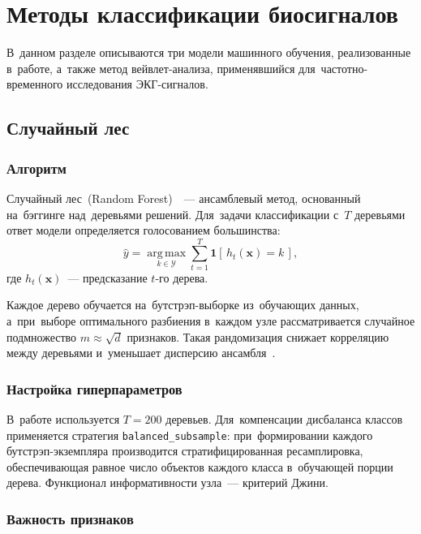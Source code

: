 \section{Методы классификации биосигналов}
\label{sec:Chapter2}

В~данном разделе описываются три модели машинного обучения,
реализованные в~работе, а~также метод вейвлет-анализа,
применявшийся для~частотно-временного исследования ЭКГ-сигналов.

\subsection{Случайный лес}

\subsubsection{Алгоритм}

Случайный лес~(Random Forest)~\cite{breiman2001}~--- ансамблевый
метод, основанный на~бэггинге над~деревьями решений.
Для~задачи классификации с~$T$ деревьями ответ модели определяется
голосованием большинства:
\begin{equation}
    \hat{y} = \operatorname*{arg\,max}_{k \in \mathcal{Y}}
    \sum_{t=1}^{T} \mathbf{1}[\,h_t(\mathbf{x}) = k\,],
\end{equation}
где $h_t(\mathbf{x})$~--- предсказание $t$-го дерева.

Каждое дерево обучается на~бутстрэп-выборке из~обучающих данных,
а~при~выборе оптимального разбиения в~каждом узле рассматривается
случайное подмножество $m \approx \sqrt{d}$ признаков.
Такая рандомизация снижает корреляцию между деревьями и~уменьшает
дисперсию ансамбля~\cite{breiman2001}.

\subsubsection{Настройка гиперпараметров}

В~работе используется $T = 200$ деревьев.
Для~компенсации дисбаланса классов применяется стратегия
\texttt{balanced\_subsample}: при~формировании каждого
бутстрэп-экземпляра производится стратифицированная
ресамплировка, обеспечивающая равное число объектов каждого
класса в~обучающей порции дерева.
Функционал информативности узла~--- критерий Джини.

\subsubsection{Важность признаков}

